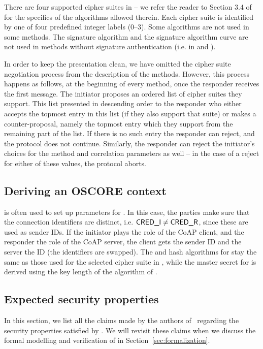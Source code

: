 {There are four supported cipher suites in \mEdhoc -- we refer the reader to Section 3.4 of~\cite{selander-lake-edhoc-01} for the specifics of the algorithms allowed therein. Each cipher suite is identified by one of four predefined integer labels (0--3). Some algorithms are not used in some methods.  The signature algorithm and the signature algorithm curve are not used in methods without signature authentication (i.e. in \mPskPsk{} and \mStatStat).

In order to keep the presentation clean, we have omitted the cipher suite negotiation process from the description of the methods. However, this process happens as follows, at the beginning of every method, once the responder receives the first message. The initiator proposes an ordered list of cipher suites they support. This list presented in descending order to the responder who either accepts the topmost entry in this list (if they also support that suite) or makes a counter-proposal, namely the topmost entry which they support from the remaining part of the list. If there is no such entry the responder can reject, and the protocol does not continue. Similarly, the responder can reject the initiator's choices for the method and correlation parameters as well -- in the case of a reject for either of these values, the protocol aborts.


\subsection{Deriving an OSCORE context}
\mEdhoc{} is often used to set up parameters for \mOscore. In this case, the parties make sure that the connection identifiers are distinct, i.e. $\text{\textup{\textsf{CRED\_I}}} \neq \text{\textup{\textsf{CRED\_R}}}$, since these are used as \mOscore{} sender IDs. If the initiator plays the role of the CoAP client, and the responder the role of the CoAP server, the client gets the sender ID \mCredr and the server the ID \mCredi (the identifiers are swapped). The \mAead{} and hash algorithms for \mOscore{} stay the same as those used for the selected cipher suite in \mEdhoc, while the master secret for \mOscore{} is derived using the key length of the \mAead{} algorithm of \mEdhoc. 

\subsection{Expected security properties}
In this section, we list all the claims made by the authors of~\cite{selander-lake-edhoc-01} regarding the security properties satisfied by \mEdhoc. We will revisit these claims when we discuss the formal modelling and verification of \mEdhoc{} in Section~\ref{sec:formalization}. 

}
